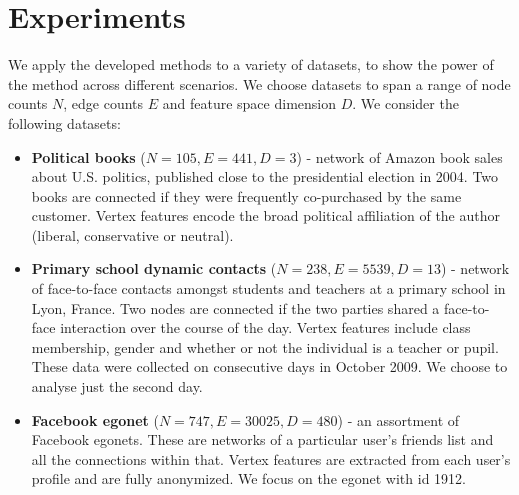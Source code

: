 \section{Experiments}
\label{sec:experiments}

We apply the developed methods to a variety of datasets, to show the power of the method across different scenarios. We choose datasets to span a range of node counts $N$, edge counts $E$ and feature space dimension $D$. We consider the following datasets:

\begin{itemize}
	\item \textbf{Political books} \cite{polbooks} ($N=105, E=441, D=3$) - network of Amazon book sales about U.S. politics, published close to the presidential election in 2004. Two books are connected if they were frequently co-purchased by the same customer. Vertex features encode the broad political affiliation of the author (liberal, conservative or neutral).
		
	\item \textbf{Primary school dynamic contacts} \cite{schools} ($N=238, E=5539, D=13$) - network of face-to-face contacts amongst students and teachers at a primary school in Lyon, France. Two nodes are connected if the two parties shared a face-to-face interaction over the course of the day. Vertex features include class membership, gender and whether or not the individual is a teacher or pupil. These data were collected on consecutive days in October 2009. We choose to analyse just the second day.
	
	\item \textbf{Facebook egonet} \cite{fb-snap} ($N=747, E=30025, D=480$) - an assortment of Facebook egonets. These are networks of a particular user's friends list and all the connections within that. Vertex features are extracted from each user's profile and are fully anonymized. We focus on the egonet with id 1912.
	
%		
%	

\end{itemize}


